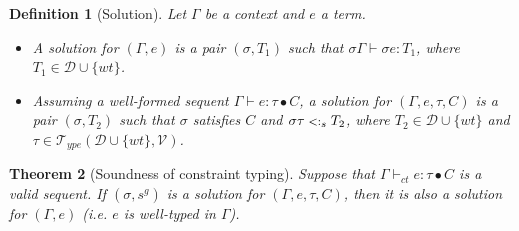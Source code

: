 \documentclass{eptcs}
\newcommand{\TT}{\ensuremath{\mathcal{T}}\xspace}
\newcommand{\VV}{\ensuremath{\mathcal{V}}\xspace}
\newcommand{\caD}{\ensuremath{\mathcal{D}}\xspace}
\newcommand{\CC}{\ensuremath{C}\xspace}
\newcommand{\TYDV}{\ensuremath{\TT_{ype}(\caD \cup \{wt\},\VV)}\xspace}
\newcommand{\sub}{\mathrel{\mbox{{\footnotesize $<:$}}}}
\newcommand{\wt}[0]{{\ensuremath{wt}}}
\newcommand{\ctvdash}{\ensuremath{\vdash_{ct}}}
\newtheorem{thm}{Theorem}[section]
\newtheorem{defn}[thm]{Definition}
\begin{document}
\begin{defn}[Solution]
Let $\Gamma$ be a context and $e$ a term. 
\begin{itemize}
\item A {\em solution} for $(\Gamma,e)$ is a pair $(\sigma, T_1)$ such that $\sigma\Gamma
  \vdash \sigma e : T_1$, where $T_1 \in \caD \cup \{\wt\}$.
\item Assuming a well-formed sequent $\Gamma \vdash e : \tau \bullet \CC$, a
{\em solution} for
  $(\Gamma,e,\tau,\CC)$ is a pair $(\sigma,T_2)$ such that $\sigma$ satisfies $\CC$ and
  $\sigma\tau \sub_s T_2$, where $T_2 \in \caD\cup\{\wt\}$ and $\tau \in \TYDV$.
\end{itemize}
\end{defn}

\begin{thm}[Soundness of constraint typing]
\label{thm:soundness}
Suppose that $\Gamma \ctvdash e : \tau \bullet \CC$ is a valid sequent. If $(\sigma, s^g)$ is a
solution for $(\Gamma, e, \tau, \CC)$, then it is also a solution for
$(\Gamma,e)$ (i.e. $e$ is well-typed in $\Gamma$).
\end{thm}
\end{document}
